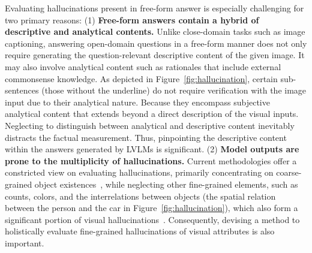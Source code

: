 
Evaluating hallucinations present in free-form answer is especially challenging for two primary reasons:
(1) \textbf{Free-form answers contain a hybrid of descriptive and analytical contents.} Unlike close-domain tasks such as image captioning, answering open-domain questions in a free-form manner does not only require generating the question-relevant descriptive content of the given image. It may also involve analytical content such as rationales that include external commonsense knowledge. As depicted in Figure~\ref{fig:hallucination}, certain sub-sentences (\ie those without the underline) do not require verification with the image input due to their analytical nature. 
Because they encompass subjective analytical content that extends beyond a direct description of the visual inputs.
Neglecting to distinguish between analytical and descriptive content inevitably distracts the factual measurement.
Thus, pinpointing the descriptive content within the answers generated by LVLMs is significant. 
(2) \textbf{Model outputs are prone to the multiplicity of hallucinations.} Current methodologies offer a constricted view on evaluating hallucinations, primarily concentrating on coarse-grained object existences~\cite{DBLP:conf/emnlp/RohrbachHBDS18,lovenia2023negative}, while neglecting other fine-grained elements, such as counts, colors, and the interrelations between objects (\eg the spatial relation between the person and the car in Figure~\ref{fig:hallucination}), which also form a significant portion of visual hallucinations~\cite{gunjal2023detecting}.
Consequently, devising a method to holistically evaluate fine-grained hallucinations of visual attributes is also important.

